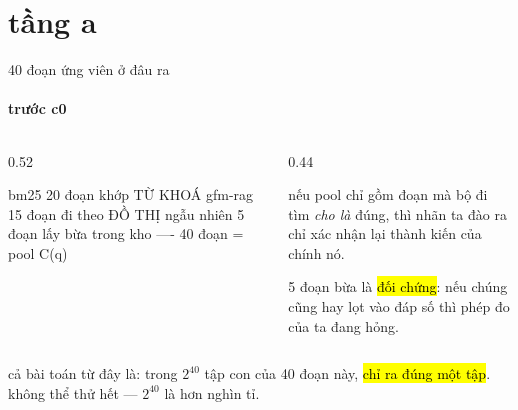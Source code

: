 \section{tầng a}

\begin{frame}[fragile]{40 đoạn ứng viên ở đâu ra}
  \framesubtitle{trước c0}

  \begin{columns}[t]
  \begin{column}{0.52\textwidth}
    \begin{bx}[title={ba nguồn, mỗi nguồn một hạn ngạch}]
      \begin{dia}
bm25        20 đoạn   khớp TỪ KHOÁ
gfm-rag     15 đoạn   đi theo ĐỒ THỊ
ngẫu nhiên   5 đoạn   lấy bừa trong kho
                    ----
                      40 đoạn = pool C(q)
      \end{dia}
      \vspace{0.25em}
    \end{bx}
  \end{column}
  \begin{column}{0.44\textwidth}
    \begin{bx}[title={vì sao phải có nguồn ngẫu nhiên}]
      nếu pool chỉ gồm đoạn mà bộ đi tìm \emph{cho là} đúng, thì nhãn ta đào ra
      chỉ xác nhận lại thành kiến của chính nó.
      \vspace{0.3em}

      5 đoạn bừa là \hl{đối chứng}: nếu chúng cũng hay lọt vào đáp số thì phép đo
      của ta đang hỏng.
    \end{bx}
  \end{column}
  \end{columns}

  \vspace{0.4em}
  \begin{keyb}
    cả bài toán từ đây là: trong $2^{40}$ tập con của 40 đoạn này,
    \hl{chỉ ra đúng một tập}. không thể thử hết — $2^{40}$ là hơn nghìn tỉ.
  \end{keyb}
\end{frame}


